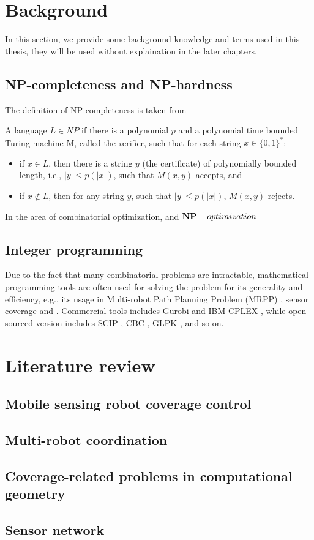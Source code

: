\section{Background}
In this section, we provide some background knowledge and terms used in this thesis,
they will be used without explaination in the later chapters. 

\subsection{NP-completeness and NP-hardness}
The definition of NP-completeness is taken from \cite{vazirani2001approximation}
\begin{definition}[NP-completeness]
    A language $L\in NP$ if there is a polynomial $p$ and a polynomial time bounded Turing machine M, 
    called the {\textit verifier}, such that for each string $x\in \{0, 1\}^*$: 
\begin{itemize}
    \item if $x\in L$, then there is a string $y$ (the certificate) of polynomially bounded length, i.e., $|y| \leq p(|x|)$,
    such that $M(x, y)$ accepts, and 
    \item if $x\notin L$, then for any string $y$, such that $|y|\leq p(|x|)$, $M(x,y)$ rejects.
\end{itemize}
\end{definition}

In the area of combinatorial optimization, and ${\bold{NP}}-optimization$ 
\subsection{Integer programming}
Due to the fact that many combinatorial problems are intractable, mathematical programming tools are often 
used for solving the problem for its generality and efficiency, e.g., its usage in Multi-robot Path Planning Problem (MRPP) 
\cite{HanYu19IROS, GuoHanYu21ICRA}, sensor coverage and . 
Commercial tools includes Gurobi \cite{optimization2019gurobi} and IBM CPLEX \cite{cplex2009v12}, while open-sourced version
includes SCIP \cite{achterberg2009scip}, CBC \cite{forrest2005cbc}, GLPK \cite{makhorin2008glpk}, and so on. 

\section{Literature review} 
\subsection{Mobile sensing robot coverage control}
\subsection{Multi-robot coordination}
\subsection{Coverage-related problems in computational geometry}
\subsection{Sensor network}
